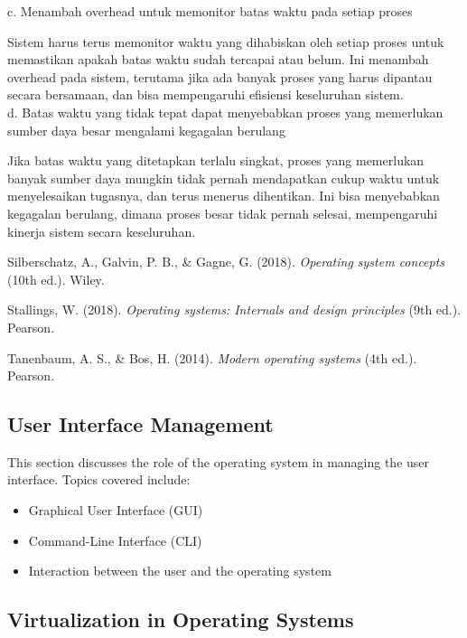 \documentclass[12pt]{article}
\begin{document}
    c. Menambah overhead untuk memonitor batas waktu pada setiap proses
    
    Sistem harus terus memonitor waktu yang dihabiskan oleh setiap proses untuk memastikan apakah batas waktu sudah tercapai atau belum. Ini menambah overhead pada sistem, terutama jika ada banyak proses yang harus dipantau secara bersamaan, dan bisa mempengaruhi efisiensi keseluruhan sistem.\\

    d. Batas waktu yang tidak tepat dapat menyebabkan proses yang memerlukan sumber daya besar mengalami kegagalan berulang
    
    Jika batas waktu yang ditetapkan terlalu singkat, proses yang memerlukan banyak sumber daya mungkin tidak pernah mendapatkan cukup waktu untuk menyelesaikan tugasnya, dan terus menerus dihentikan. Ini bisa menyebabkan kegagalan berulang, dimana proses besar tidak pernah selesai, mempengaruhi kinerja sistem secara keseluruhan.\\

    \begin{thebibliography}{9}

        Silberschatz, A., Galvin, P. B., \& Gagne, G. (2018). \textit{Operating system concepts} (10th ed.). Wiley.
        
        Stallings, W. (2018). \textit{Operating systems: Internals and design principles} (9th ed.). Pearson.
        
        Tanenbaum, A. S., \& Bos, H. (2014). \textit{Modern operating systems} (4th ed.). Pearson.
        
    \end{thebibliography}

\subsection{User Interface Management}
This section discusses the role of the operating system in managing the user interface. Topics covered include:
\begin{itemize}
    \item Graphical User Interface (GUI)
    \item Command-Line Interface (CLI)
    \item Interaction between the user and the operating system
\end{itemize}

\subsection{Virtualization in Operating Systems}
\end{document}
